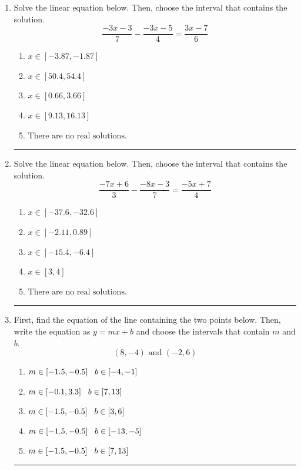 \documentclass[14pt]{extbook}
\newcommand{\litem}[1]{\item#1\hspace*{-1cm}\rule{\textwidth}{0.4pt}}
\begin{document}
\begin{enumerate}
{\begin{enumerate}[label=\Alph*.]
\end{enumerate} }
\litem{
Solve the linear equation below. Then, choose the interval that contains the solution.\[ \frac{-3x -3}{7} - \frac{-3x -5}{4} = \frac{3x -7}{6} \]\begin{enumerate}[label=\Alph*.]
\item \( x \in [-3.87, -1.87] \)
\item \( x \in [50.4, 54.4] \)
\item \( x \in [0.66, 3.66] \)
\item \( x \in [9.13, 16.13] \)
\item \( \text{There are no real solutions.} \)

\end{enumerate} }
\litem{
Solve the linear equation below. Then, choose the interval that contains the solution.\[ \frac{-7x + 6}{3} - \frac{-8x -3}{7} = \frac{-5x + 7}{4} \]\begin{enumerate}[label=\Alph*.]
\item \( x \in [-37.6, -32.6] \)
\item \( x \in [-2.11, 0.89] \)
\item \( x \in [-15.4, -6.4] \)
\item \( x \in [3, 4] \)
\item \( \text{There are no real solutions.} \)

\end{enumerate} }
\litem{
First, find the equation of the line containing the two points below. Then, write the equation as $ y=mx+b $ and choose the intervals that contain $m$ and $b$.\[ (8, -4) \text{ and } (-2, 6) \]\begin{enumerate}[label=\Alph*.]
\item \( m \in [-1.5, -0.5] \hspace*{3mm} b \in [-4, -1] \)
\item \( m \in [-0.1, 3.3] \hspace*{3mm} b \in [7, 13] \)
\item \( m \in [-1.5, -0.5] \hspace*{3mm} b \in [3, 6] \)
\item \( m \in [-1.5, -0.5] \hspace*{3mm} b \in [-13, -5] \)
\item \( m \in [-1.5, -0.5] \hspace*{3mm} b \in [7, 13] \)

\end{enumerate} }
\end{enumerate}
\end{document}
